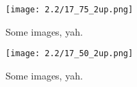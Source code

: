 \begin{figure}[h]
	\begin{center}
	\texttt{[image: 2.2/17\_75\_2up.png]}
	\caption{Some images, yah.}
	\end{center}
\end{figure}

\clearpage

\begin{figure}[h]
	\begin{center}
	\texttt{[image: 2.2/17\_50\_2up.png]}
	\caption{Some images, yah.}
	\end{center}
\end{figure}

